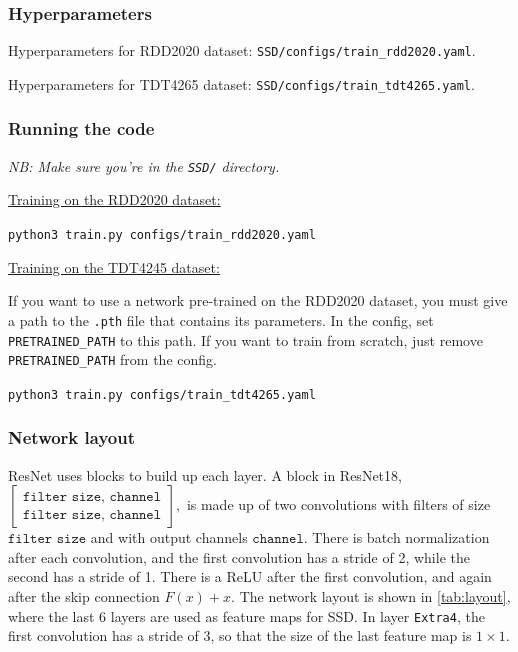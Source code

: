 \subsubsection*{Hyperparameters}

Hyperparameters for RDD2020 dataset: \texttt{SSD/configs/train\_rdd2020.yaml}.

Hyperparameters for TDT4265 dataset: \texttt{SSD/configs/train\_tdt4265.yaml}.

\subsubsection*{Running the code}
\emph{NB: Make sure you're in the \texttt{SSD/} directory.}

\underline{Training on the RDD2020 dataset:}

\texttt{python3 train.py configs/train\_rdd2020.yaml}

\underline{Training on the TDT4245 dataset:}

If you want to use a network pre-trained on the RDD2020 dataset, you must give a path to the \texttt{.pth} file that contains its parameters. In the config, set \texttt{PRETRAINED\_PATH} to this path. If you want to train from scratch, just remove \texttt{PRETRAINED\_PATH} from the config.

\texttt{python3 train.py configs/train\_tdt4265.yaml}


\subsubsection*{Network layout}

ResNet uses blocks to build up each layer. A block in ResNet18,
$
\begin{bmatrix}
  \texttt{filter size, channel} \\
  \texttt{filter size, channel}
\end{bmatrix},
$
is made up of two convolutions with filters of size $\texttt{filter size}$ and with output channels $\texttt{channel}$. There is batch normalization after each convolution, and the first convolution has a stride of 2, while the second has a stride of 1. There is a ReLU after the first convolution, and again after the skip connection $F(x)+x$. The network layout is shown in \cref{tab:layout}, where the last 6 layers are used as feature maps for SSD. In layer \texttt{Extra4}, the first convolution has a stride of 3, so that the size of the last feature map is $1\times1$.

